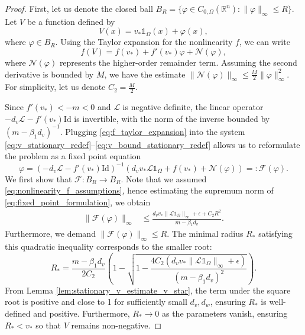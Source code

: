 \documentclass[11pt, a4paper]{article}
\theoremstyle{break}
\theoremstyle{break}
\theoremstyle{break}
\theoremstyle{break}
\theoremstyle{break}
\theoremstyle{break}
\theoremstyle{break}
\theoremstyle{break}
\theoremstyle{break}
\theoremstyle{break}
\begin{document}
\begin{proof}
    First, let us denote the closed ball $B_R = \{ \varphi \in C_{0, \Omega}(\mathbb{R}^n) : \|\varphi\|_\infty \leq R \}$. 
    Let $V$ be a function defined by
    \begin{equation}
        \label{eq:stationary_u_definition}
        V(x) = v_* \mathds{1}_{\Omega}(x) + \varphi(x),
    \end{equation}
    where $\varphi \in B_R$. Using the Taylor expansion for the nonlinearity $f$, we can write
    \begin{equation}
        \label{eq:f_taylor_expansion}
        f(V) = f(v_*) + f'(v_*) \varphi + \mathcal{N}(\varphi),
    \end{equation}
    where $\mathcal{N}(\varphi)$ represents the higher-order remainder term. Assuming the second derivative is bounded by $M$, we have the estimate $\|\mathcal{N}(\varphi)\|_\infty \leq \frac{M}{2} \|\varphi\|_\infty^2$. For simplicity, let us denote $C_2 = \frac{M}{2}$.
    
    Since $f'(v_*) < -m < 0$ and $\mathcal{L}$ is negative definite, the linear operator $-d_v \mathcal{L} - f'(v_*) \mathrm{Id}$ is invertible, with the norm of the inverse bounded by $(m - \beta_1 d_v)^{-1}$. Plugging \eqref{eq:f_taylor_expansion} into the system \eqref{eq:v_stationary_redef}--\eqref{eq:v_bound_stationary_redef} allows us to reformulate the problem as a fixed point equation
    \begin{equation}
        \label{eq:fixed_point_formulation}
        \varphi = \left( -d_v \mathcal{L} - f'(v_*) \mathrm{Id} \right)^{-1} \left( d_v v_* \mathcal{L} \mathds{1}_\Omega + f(v_*) + \mathcal{N}(\varphi) \right) =: \mathcal{F}(\varphi).
    \end{equation}
    We first show that $\mathcal{F}: B_R \to B_R$. Note that we assumed \eqref{eq:nonlinearity_f_assumptions}, hence estimating the supremum norm of \eqref{eq:fixed_point_formulation}, we obtain
    \begin{align}
        \label{eq:f_ball_to_ball_condition_1}
        \| \mathcal{F}(\varphi) \|_\infty 
        &\leq
        \frac{d_v v_* \|\mathcal{L}\mathds{1}_\Omega\|_\infty + \epsilon + C_2 R^2}{m - \beta_1 d_v}.
    \end{align}
    Furthermore, we demand $\|\mathcal{F}(\varphi)\|_\infty \leq R$. The minimal radius $R_*$ satisfying this quadratic inequality corresponds to the smaller root:
    \begin{equation}
        \label{eq:f_ball_to_ball_radius}
        R_* = \frac{m - \beta_1 d_v}{2 C_2}
        \left(1 - 
        \sqrt{ 
        1 
        -
        \frac{4 C_2 (d_v v_* \|\mathcal{L}\mathds{1}_\Omega\|_\infty + \epsilon)}{(m - \beta_1 d_v)^2}
        }
        \right).
    \end{equation}
    From Lemma \ref{lem:stationary_v_estimate_v_star}, the term under the square root is positive and close to 1 for sufficiently small $d_v, d_w$, ensuring $R_*$ is well-defined and positive. Furthermore, $R_* \to 0$ as the parameters vanish, ensuring $R_* < v_*$ so that $V$ remains non-negative.


\end{proof}
\end{document}
